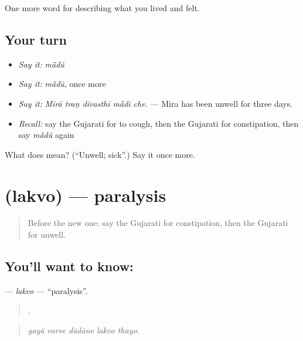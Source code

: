 \begin{grammarlens}[title={What you've built}]
One more word for describing what you lived and felt.
\end{grammarlens}

\subsection*{Your turn}
\begin{itemize}
\raggedright
  \item \emph{Say it:} \emph{mā̃dũ}
  \item \emph{Say it:} \emph{mā̃dũ}, once more
  \item \emph{Say it:} \emph{Mīrā traṇ divasthī mā̃dī che.} — Mira has been unwell for three days.
  \item \emph{Recall:} say the Gujarati for to cough, then the Gujarati for constipation, then say \emph{mā̃dũ} again
\end{itemize}

\begin{tcolorbox}[breakable,colback=teal!4,colframe=teal!35!black,title={Before you move on}]
What does  mean? (\textquotedblleft{}Unwell; sick\textquotedblright{}.) Say it once more.
\end{tcolorbox}
\section[\texorpdfstring{\gu{લકવો} (lakvo)}{લકવો (lakvo)}]{ (lakvo) — paralysis}

\label{lesson:GU-C479-lakvo}



\begin{quote}
Before the new one: say the Gujarati for constipation, then the Gujarati for unwell.
\end{quote}

\subsection*{You'll want to know: }
\textbf{} — \emph{lakvo} — \textquotedblleft{}paralysis\textquotedblright{}.

\begin{quote}
    .
\end{quote}

\begin{quote}
\emph{gayā varse dādāne lakvo thayo.}
\end{quote}

